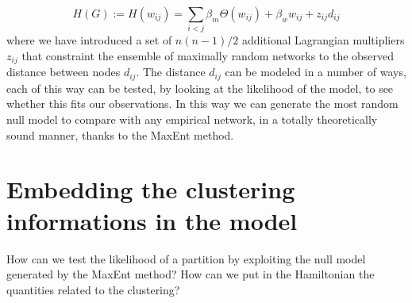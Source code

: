 \documentclass[a4paper]{article}
\begin{document}
\begin{equation}
H(G) := H(w_{ij}) = \sum_{i<j}  \beta_m \Theta(w_{ij}) + \beta_w w_{ij} + z_{ij} d_{ij}
\end{equation}
where we have introduced a set of $n(n-1)/2$ additional Lagrangian multipliers $z_{ij}$ that constraint the ensemble of maximally random networks to the observed distance between nodes $d_{ij}$. The distance $d_{ij}$ can be modeled in a number of ways, each of this way can be tested, by looking at the likelihood of the model, to see whether this fits our observations.
In this way we can generate the most random null model to compare with any empirical network, in a totally theoretically sound manner, thanks to the MaxEnt method.

\section{Embedding the clustering informations in the model}
How can we test the likelihood of a partition by exploiting the null model generated by the MaxEnt method?
How can we put in the Hamiltonian the quantities related to the clustering?




\end{document}
